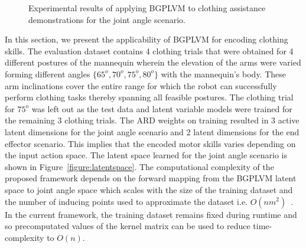 \documentclass{article}
\begin{document}
\begin{figure}
  \centering
  \caption{Experimental results of applying BGPLVM to clothing assistance demonstrations for the joint angle scenario.}
  \label{figure:results}
\end{figure}

In this section, we present the applicability of BGPLVM for encoding clothing skills. The evaluation dataset contains 4 clothing trials that were obtained for 4 different postures of the mannequin wherein the elevation of the arms were varied forming different angles $\{65^o, 70^o, 75^o, 80^o\}$ with the mannequin's body. These arm inclinations cover the entire range for which the robot can successfully perform clothing tasks thereby spanning all feasible postures. The clothing trial for $75^o$ was left out as the test data and latent variable models were trained for the remaining 3 clothing trials. The ARD weights on training resulted in 3 active latent dimensions for the joint angle scenario and 2 latent dimensions for the end effector scenario. This implies that the encoded motor skills varies depending on the input action space. The latent space learned for the joint angle scenario is shown in Figure~\ref{figure:latentspace}. The computational complexity of the proposed framework depends on the forward mapping from the BGPLVM latent space to joint angle space which scales with the size of the training dataset and the number of inducing points used to approximate the dataset i.e. $O(nm^2)$~\cite{bgplvm}. In the current framework, the training dataset remains fixed during runtime and so precomputated values of the kernel matrix can be used to reduce time-complexity to $O(n)$.
\end{document}
